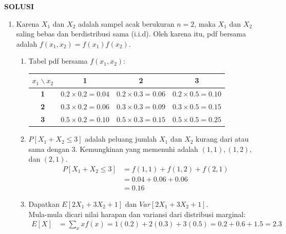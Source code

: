 \documentclass[11pt,letterpaper]{article}
\begin{document}
\newpage
\begin{center}
  \textbf{SOLUSI}
\end{center}
\begin{enumerate}
  \item Karena $X_1$ dan $X_2$ adalah sampel acak berukuran $n=2$, maka $X_1$ dan $X_2$ saling bebas dan berdistribusi sama (i.i.d). Oleh karena itu, pdf bersama adalah $f(x_1, x_2) = f(x_1)f(x_2)$.
        \begin{enumerate}[label=\alph*)]
          \item Tabel pdf bersama $f(x_1, x_2)$:
                \begin{center}
                  \begin{tabular}{|c|c|c|c|}
                    \hline
                    $x_1 \backslash x_2$ & \textbf{1}              & \textbf{2}              & \textbf{3}              \\ \hline
                    \textbf{1}           & $0.2 \times 0.2 = 0.04$ & $0.2 \times 0.3 = 0.06$ & $0.2 \times 0.5 = 0.10$ \\ \hline
                    \textbf{2}           & $0.3 \times 0.2 = 0.06$ & $0.3 \times 0.3 = 0.09$ & $0.3 \times 0.5 = 0.15$ \\ \hline
                    \textbf{3}           & $0.5 \times 0.2 = 0.10$ & $0.5 \times 0.3 = 0.15$ & $0.5 \times 0.5 = 0.25$ \\ \hline
                  \end{tabular}
                \end{center}
          \item $P[X_1 + X_2 \le 3]$ adalah peluang jumlah $X_1$ dan $X_2$ kurang dari atau sama dengan 3. Kemungkinan yang memenuhi adalah $(1,1), (1,2),$ dan $(2,1)$.
                \begin{align*}
                  P[X_1 + X_2 \le 3] & = f(1,1) + f(1,2) + f(2,1) \\
                                     & = 0.04 + 0.06 + 0.06       \\
                                     & = 0.16
                \end{align*}
          \item Dapatkan $E[2X_1 + 3X_2 + 1]$ dan $Var[2X_1 + 3X_2 + 1]$. \\
                Mula-mula dicari nilai harapan dan variansi dari distribusi marginal:
                \begin{align*}
                  E[X]   & = \sum_{x} x f(x) = 1(0.2) + 2(0.3) + 3(0.5) = 0.2 + 0.6 + 1.5 = 2.3         \\

\end{align*}
\end{enumerate}
\end{enumerate}
\end{document}
